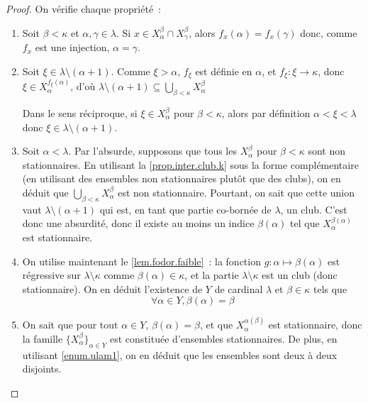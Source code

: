 \begin{proof}
  On vérifie chaque propriété~:
  \begin{enumerate}[label=(\roman*)]
  \item Soit $\beta < \kappa$ et $\alpha, \gamma \in\lambda$. Si
    $x\in X_\alpha^\beta \cap X_\gamma^\beta$, alors $f_x(\alpha) = f_x(\gamma)$
    donc, comme $f_x$ est une injection, $\alpha = \gamma$.
  \item Soit $\xi \in \lambda \setminus (\alpha + 1)$. Comme $\xi > \alpha$,
    $f_\xi$ est définie en $\alpha$, et $f_\xi : \xi \to \kappa$, donc
    $\xi \in X_\alpha^{f_\xi(\alpha)}$, d'où
    $\displaystyle
    \lambda\setminus(\alpha+1)\subseteq\bigcup_{\beta < \kappa} X_\alpha^\beta$

    Dans le sens réciproque, si $\xi \in X_\alpha^\beta$ pour $\beta <\kappa$,
    alors par définition $\alpha < \xi < \lambda$ donc
    $\xi \in \lambda\setminus(\alpha + 1)$.
  \item Soit $\alpha < \lambda$. Par l'absurde, supposons que tous les
    $X_\alpha^\beta$ pour $\beta < \kappa$ sont non stationnaires. En utilisant
    la \cref{prop.inter.club.k} sous la forme complémentaire (en utilisant des
    ensembles non stationnaires plutôt que des clubs), on en déduit que
    $\displaystyle\bigcup_{\beta < \kappa} X_\alpha^\beta$ est non stationnaire.
    Pourtant, on sait que cette union vaut $\lambda \setminus(\alpha + 1)$ qui
    est, en tant que partie co-bornée de $\lambda$, un club. C'est donc une
    absurdité, donc il existe au moins un indice $\beta(\alpha)$ tel que
    $X_\alpha^{\beta(\alpha)}$ est stationnaire.
  \item On utilise maintenant le \cref{lem.fodor.faible}~: la fonction
    $g : \alpha \mapsto \beta(\alpha)$ est régressive sur
    $\lambda\setminus\kappa$ comme $\beta(\alpha) \in \kappa$, et la partie
    $\lambda\setminus\kappa$ est un club (donc stationnaire). On en déduit
    l'existence de $Y$ de cardinal $\lambda$ et $\beta \in \kappa$ tels que
    \[\forall \alpha \in Y, \beta(\alpha) = \beta\]
  \item On sait que pour tout $\alpha \in Y$, $\beta(\alpha) = \beta$, et
    que $X_\alpha^{\alpha(\beta)}$ est stationnaire, donc la famille
    $\{X_\alpha^\beta\}_{\alpha \in Y}$ est constituée d'ensembles stationnaires. De
    plus, en utilisant \ref{enum.ulam1}, on en déduit que les ensembles sont
    deux à deux disjoints.
  \end{enumerate}
\end{proof}

